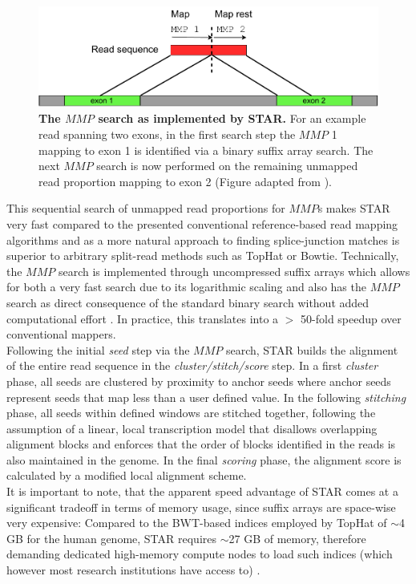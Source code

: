 \begin{figure}[h]
	 \centering
	 \includegraphics[width=0.7\linewidth]{img/chapter1/STAR}
	  \caption[The $MMP$ search as implemented by STAR]{\textbf{The $MMP$ search as implemented by STAR.} For an example read spanning two exons, in the first search step the $MMP$ 1 mapping to exon 1 is identified via a binary suffix array search. The next $MMP$ search is now performed on the remaining unmapped read proportion mapping to exon 2 (Figure adapted from \citeauthor{Dobin2013} \citep{Dobin2013}).}
	 \label{fig:star}
\end{figure}

This sequential search of unmapped read proportions for $MMP$s makes STAR very fast compared to the presented conventional reference-based read mapping algorithms and as a more natural approach to finding splice-junction matches is superior to arbitrary split-read methods such as TopHat or Bowtie. Technically, the $MMP$ search is implemented through uncompressed suffix arrays which allows for both a very fast search due to its logarithmic scaling and also has the $MMP$ search as direct consequence of the standard binary search without added computational effort \citep{Dobin2013}. In practice, this translates into a $>$ 50-fold speedup over conventional mappers. \\
Following the initial \textit{seed} step via the $MMP$ search, STAR builds the alignment of the entire read sequence in the \textit{cluster/stitch/score} step. In a first \textit{cluster} phase, all seeds are clustered by proximity to anchor seeds where anchor seeds represent seeds that map less than a user defined value. In the following \textit{stitching} phase, all seeds within defined windows are stitched together, following the assumption of a linear, local transcription model that disallows overlapping alignment blocks and enforces that the order of blocks identified in the reads is also maintained in the genome. In the final \textit{scoring} phase, the alignment score is calculated by a modified local alignment scheme. \\
It is important to note, that the apparent speed advantage of STAR comes at a significant tradeoff in terms of memory usage, since suffix arrays are space-wise very expensive: Compared to the BWT-based indices employed by TopHat of $\sim$4 GB for the human genome, STAR requires $\sim$27 GB of memory, therefore demanding dedicated high-memory compute nodes to load such indices (which however most research institutions have access to) \citep{Dobin2013}.

